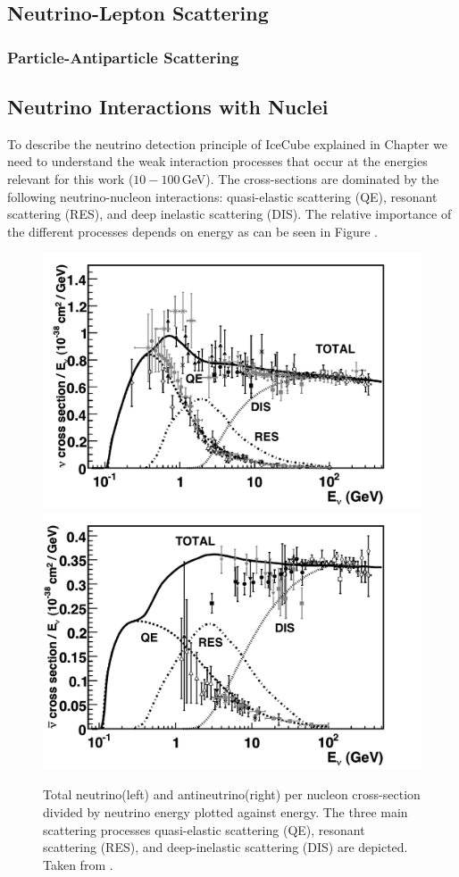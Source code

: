 \subsection{Neutrino-Lepton Scattering}

\subsubsection{Particle-Antiparticle Scattering}


\subsection{Neutrino Interactions with Nuclei}

To describe the neutrino detection principle of IceCube explained in Chapter  we need to understand the weak interaction processes that occur at the energies relevant for this work ($10-100$\,GeV).
The cross-sections are dominated by the following neutrino-nucleon interactions: quasi-elastic scattering (QE), resonant scattering (RES), and deep inelastic scattering (DIS).
The relative importance of the different processes depends on energy as can be seen in Figure .

\begin{figure}[ht]
	\centering
    \includegraphics[width=0.495\linewidth]{figures/neutrinos_properties/cc_inclusive_nu.pdf}
    \includegraphics[width=0.495\linewidth]{figures/neutrinos_properties/cc_inclusive_nubar.pdf}
	\caption[Total inclusive neutrino-nucleon cross-sections, taken from \cite{Formaggio_Cross_Sections}.]{Total neutrino(left) and antineutrino(right) per nucleon cross-section divided by neutrino energy plotted against energy.
    The three main scattering processes quasi-elastic scattering (QE), resonant scattering (RES), and deep-inelastic scattering (DIS) are depicted. Taken from \cite{Formaggio_Cross_Sections}.}
\end{figure}

